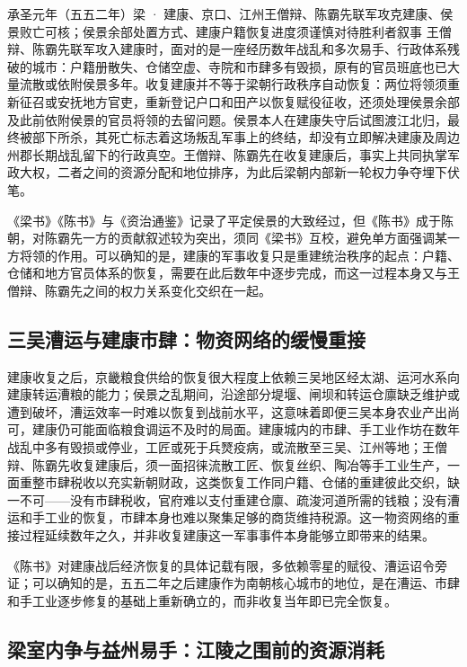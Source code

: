 \begin{event}{}{承圣元年（五五二年）}{梁 · 建康、京口、江州}{王僧辩、陈霸先联军攻克建康、侯景败亡可核；侯景余部处置方式、建康户籍恢复进度须谨慎对待胜利者叙事}
王僧辩、陈霸先联军攻入建康时，面对的是一座经历数年战乱和多次易手、行政体系残破的城市：户籍册散失、仓储空虚、寺院和市肆多有毁损，原有的官员班底也已大量流散或依附侯景多年。收复建康并不等于梁朝行政秩序自动恢复：两位将领须重新征召或安抚地方官吏，重新登记户口和田产以恢复赋役征收，还须处理侯景余部及此前依附侯景的官员将领的去留问题。侯景本人在建康失守后试图渡江北归，最终被部下所杀，其死亡标志着这场叛乱军事上的终结，却没有立即解决建康及周边州郡长期战乱留下的行政真空。王僧辩、陈霸先在收复建康后，事实上共同执掌军政大权，二者之间的资源分配和地位排序，为此后梁朝内部新一轮权力争夺埋下伏笔。

《梁书》《陈书》与《资治通鉴》记录了平定侯景的大致经过，但《陈书》成于陈朝，对陈霸先一方的贡献叙述较为突出，须同《梁书》互校，避免单方面强调某一方将领的作用。可以确知的是，建康的军事收复只是重建统治秩序的起点：户籍、仓储和地方官员体系的恢复，需要在此后数年中逐步完成，而这一过程本身又与王僧辩、陈霸先之间的权力关系变化交织在一起。
\end{event}

\subsection{三吴漕运与建康市肆：物资网络的缓慢重接}

建康收复之后，京畿粮食供给的恢复很大程度上依赖三吴地区经太湖、运河水系向建康转运漕粮的能力；侯景之乱期间，沿途部分堤堰、闸坝和转运仓廪缺乏维护或遭到破坏，漕运效率一时难以恢复到战前水平，这意味着即便三吴本身农业产出尚可，建康仍可能面临粮食调运不及时的局面。建康城内的市肆、手工业作坊在数年战乱中多有毁损或停业，工匠或死于兵燹疫病，或流散至三吴、江州等地；王僧辩、陈霸先收复建康后，须一面招徕流散工匠、恢复丝织、陶冶等手工业生产，一面重整市肆税收以充实新朝财政，这类恢复工作同户籍、仓储的重建彼此交织，缺一不可——没有市肆税收，官府难以支付重建仓廪、疏浚河道所需的钱粮；没有漕运和手工业的恢复，市肆本身也难以聚集足够的商货维持税源。这一物资网络的重接过程延续数年之久，并非收复建康这一军事事件本身能够立即带来的结果。

《陈书》对建康战后经济恢复的具体记载有限，多依赖零星的赋役、漕运诏令旁证；可以确知的是，五五二年之后建康作为南朝核心城市的地位，是在漕运、市肆和手工业逐步修复的基础上重新确立的，而非收复当年即已完全恢复。

\subsection{梁室内争与益州易手：江陵之围前的资源消耗}

